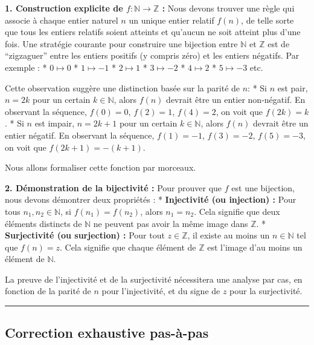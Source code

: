 \documentclass[12pt,a4paper]{report}
\begin{document}
\textbf{1. Construction explicite de \(f: \mathbb{N} \to \mathbb{Z}\) :}
Nous devons trouver une règle qui associe à chaque entier naturel \(n\)
un unique entier relatif \(f(n)\), de telle sorte que tous les entiers
relatifs soient atteints et qu'aucun ne soit atteint plus d'une fois.
Une stratégie courante pour construire une bijection entre
\(\mathbb{N}\) et \(\mathbb{Z}\) est de ``zigzaguer'' entre les entiers
positifs (y compris zéro) et les entiers négatifs. Par exemple : *
\(0 \mapsto 0\) * \(1 \mapsto -1\) * \(2 \mapsto 1\) * \(3 \mapsto -2\)
* \(4 \mapsto 2\) * \(5 \mapsto -3\) etc.

Cette observation suggère une distinction basée sur la parité de \(n\):
* Si \(n\) est pair, \(n = 2k\) pour un certain \(k \in \mathbb{N}\),
alors \(f(n)\) devrait être un entier non-négatif. En observant la
séquence, \(f(0)=0\), \(f(2)=1\), \(f(4)=2\), on voit que \(f(2k) = k\).
* Si \(n\) est impair, \(n = 2k+1\) pour un certain
\(k \in \mathbb{N}\), alors \(f(n)\) devrait être un entier négatif. En
observant la séquence, \(f(1)=-1\), \(f(3)=-2\), \(f(5)=-3\), on voit
que \(f(2k+1) = -(k+1)\).

Nous allons formaliser cette fonction par morceaux.

\textbf{2. Démonstration de la bijectivité :} Pour prouver que \(f\) est
une bijection, nous devons démontrer deux propriétés : *
\textbf{Injectivité (ou injection) :} Pour tous
\(n_1, n_2 \in \mathbb{N}\), si \(f(n_1) = f(n_2)\), alors
\(n_1 = n_2\). Cela signifie que deux éléments distincts de
\(\mathbb{N}\) ne peuvent pas avoir la même image dans \(\mathbb{Z}\). *
\textbf{Surjectivité (ou surjection) :} Pour tout \(z \in \mathbb{Z}\),
il existe au moins un \(n \in \mathbb{N}\) tel que \(f(n) = z\). Cela
signifie que chaque élément de \(\mathbb{Z}\) est l'image d'au moins un
élément de \(\mathbb{N}\).

La preuve de l'injectivité et de la surjectivité nécessitera une analyse
par cas, en fonction de la parité de \(n\) pour l'injectivité, et du
signe de \(z\) pour la surjectivité.

\begin{center}\rule{0.5\linewidth}{0.5pt}\end{center}

\subsection{Correction exhaustive
pas-à-pas}\label{correction-exhaustive-pas-uxe0-pas}
\end{document}
